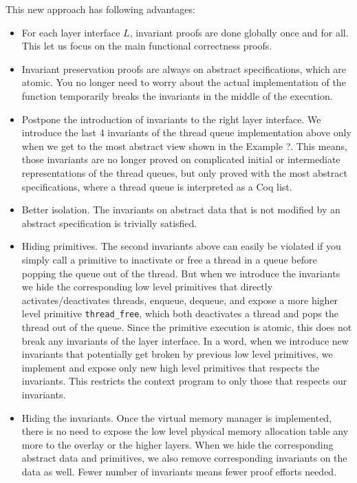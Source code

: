 {This new approach has following advantages:
\begin{itemize}
\item For each layer interface $L$, invariant proofs are done globally once and for all.
This let us focus on the main functional correctness proofs.
\item Invariant preservation proofs are always on abstract specifications, which
are atomic. You no longer need to worry about the actual implementation of the
function temporarily breaks the invariants in the middle of the execution.
\item Postpone the introduction of invariants to the right layer interface.
We introduce the last 4 invariants of the thread queue implementation above
only when we get to the most abstract view shown in the Example ?.
This means, those invariants are no longer proved on complicated initial or
intermediate representations of the thread queues, but only proved with
the most abstract specifications, where a thread queue is interpreted as a
Coq list.
\item Better isolation. The invariants on abstract data that is not modified
by an abstract specification is trivially satisfied.
\item Hiding primitives. The second invariants above can easily be violated
if you simply call a primitive to inactivate or free a thread in a queue
before popping the queue out of the thread. But when we introduce the
invariants we hide the corresponding low level primitives that directly
activates/deactivates threads, enqueue, dequeue, and expose a more higher
level primitive \verb+thread_free+, which both deactivates a thread and
pops the thread out of the queue. Since the primitive execution is atomic,
this does not break any invariants of the layer interface. In a word, when we introduce
new invariants that potentially get broken by previous low level primitives,
we implement and expose only new high level primitives that respects the
invariants. This restricts the context program to only those that respects
our invariants.
\item Hiding the invariants. Once the virtual memory manager is implemented,
there is no need to expose the low level physical memory allocation table
any more to the overlay or the higher layers. When we hide the corresponding abstract
data and primitives, we also remove corresponding invariants on the data
as well. Fewer number of invariants means fewer proof efforts needed.
\end{itemize}




}
